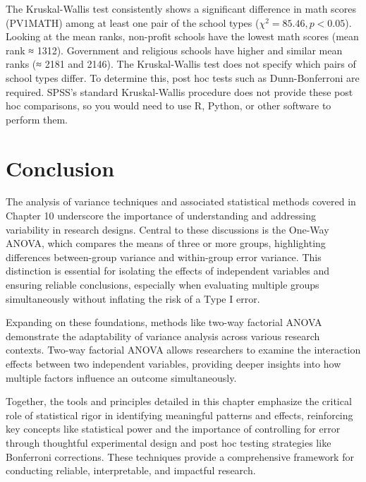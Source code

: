 \documentclass[
  letterpaper,
  DIV=11,
  numbers=noendperiod]{scrreprt}
\begin{document}
The Kruskal-Wallis test consistently shows a significant difference in
math scores (PV1MATH) among at least one pair of the school types
(\(\chi^2 = 85.46, p < 0.05\)). Looking at the mean ranks, non-profit
schools have the lowest math scores (mean rank ≈ 1312). Government and
religious schools have higher and similar mean ranks (≈ 2181 and 2146).
The Kruskal-Wallis test does not specify which pairs of school types
differ. To determine this, post hoc tests such as Dunn-Bonferroni are
required. SPSS's standard Kruskal-Wallis procedure does not provide
these post hoc comparisons, so you would need to use R, Python, or other
software to perform them.


\chapter*{Conclusion}\label{conclusion-9}


The analysis of variance techniques and associated statistical methods
covered in Chapter 10 underscore the importance of understanding and
addressing variability in research designs. Central to these discussions
is the One-Way ANOVA, which compares the means of three or more groups,
highlighting differences between-group variance and within-group error
variance. This distinction is essential for isolating the effects of
independent variables and ensuring reliable conclusions, especially when
evaluating multiple groups simultaneously without inflating the risk of
a Type I error.

Expanding on these foundations, methods like two-way factorial ANOVA
demonstrate the adaptability of variance analysis across various
research contexts. Two-way factorial ANOVA allows researchers to examine
the interaction effects between two independent variables, providing
deeper insights into how multiple factors influence an outcome
simultaneously.

Together, the tools and principles detailed in this chapter emphasize
the critical role of statistical rigor in identifying meaningful
patterns and effects, reinforcing key concepts like statistical power
and the importance of controlling for error through thoughtful
experimental design and post hoc testing strategies like Bonferroni
corrections. These techniques provide a comprehensive framework for
conducting reliable, interpretable, and impactful research.
\end{document}
